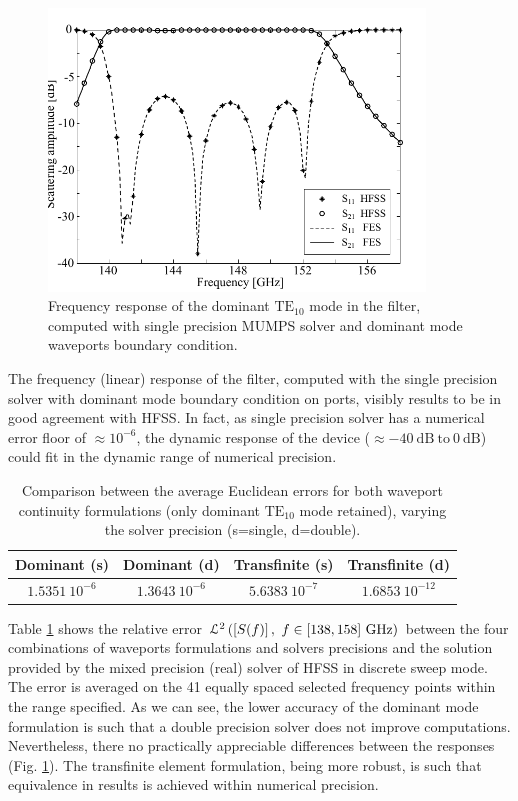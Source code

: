 \begin{figure}[ht!]
\centering
\includegraphics[width=10cm]{Bilat3Dresponse}
\caption{Frequency response of the dominant $\mathrm{TE}_{10}$ mode in the filter, computed with single precision MUMPS solver and dominant mode waveports boundary condition.}
\label{fig:Bilat3Dresponse}
\end{figure}

The frequency (linear) response of the filter, computed with the single precision solver with dominant mode boundary condition on ports, visibly results to be in good agreement with HFSS. In fact, as single precision solver has a numerical error floor of $\approx 10^{-6}$, the dynamic response of the device ($\approx -40~\mathrm{dB} ~\mathrm{to}~0~\mathrm{dB}$) could fit in the dynamic range of numerical precision.

\begin{table}[h!]
\begin{center}
\begin{tabular}{|c|c|c|c|}
\hline 
Dominant (s) & Dominant (d) & Transfinite (s) & Transfinite (d) \\ 
\hline
\hline
$   1.5351 \ 10^{-6}$ & $1.3643 \ 10^{-6}$ & $5.6383 \ 10^{-7}$ & $1.6853 \ 10^{-12}$ \\ 
\hline 
\end{tabular}
\end{center}
\caption{Comparison between the average Euclidean errors for both waveport continuity formulations (only dominant $\mathrm{TE}_{10}$ mode retained), varying the solver precision (s=single, d=double).}
\label{tab:Bilatprecision}
\end{table}

Table \ref{tab:Bilatprecision} shows the relative error $\mathcal{L}^2\left(\left[S(f)\right], \ f\in [138,158]~\mathrm{GHz}\right)$ between the four combinations of waveports formulations and solvers precisions and the solution provided by the mixed precision (real) solver of HFSS in discrete sweep mode. The error is averaged on the 41 equally spaced selected frequency points within the range specified. As we can see, the lower accuracy of the dominant mode formulation is such that a double precision solver does not improve computations. Nevertheless, there no practically appreciable differences between the responses (Fig. \ref{fig:Bilat3Dresponse}). The transfinite element formulation, being more robust, is such that equivalence in results is achieved within numerical precision.


